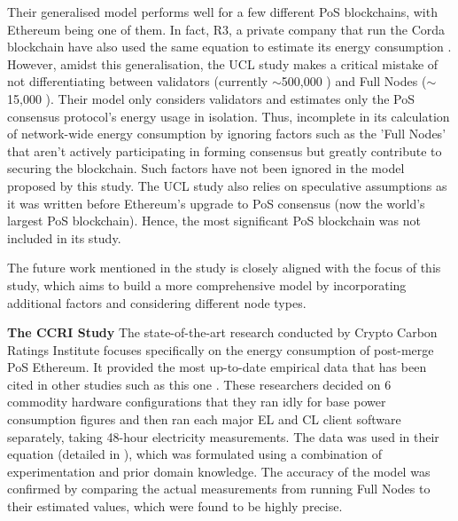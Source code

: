 Their generalised model performs well for a few different PoS blockchains, with Ethereum being one of them. In fact, R3, a private company that run the Corda blockchain have also used the same equation to estimate its energy consumption \cite{JustBlog}. However, amidst this generalisation, the UCL study makes a critical mistake of not differentiating between validators (currently $\sim$500,000 \cite{EthereumEthereum.orgc}) and Full Nodes ($\sim$15,000 \cite{NodewatchAnalytics}). Their model only considers validators and estimates only the PoS consensus protocol’s energy usage in isolation. Thus, incomplete in its calculation of network-wide energy consumption by ignoring factors such as the 'Full Nodes' that aren't actively participating in forming consensus but greatly contribute to securing the blockchain. Such factors have not been ignored in the model proposed by this study. The UCL study also relies on speculative assumptions as it was written before Ethereum’s upgrade to PoS consensus (now the world’s largest PoS blockchain). Hence, the most significant PoS blockchain was not included in its study.

The future work mentioned in the study is closely aligned with the focus of this study, which aims to build a more comprehensive model by incorporating additional factors and considering different node types.


\textbf{The CCRI Study } 
\label{CCRIModelLitRev}
The state-of-the-art research conducted by Crypto Carbon Ratings Institute focuses specifically on the energy consumption of post-merge PoS Ethereum. It provided the most up-to-date empirical data that has been cited in other studies such as this one \cite{CryptoCarbonRatingsInstitute2022TheNetwork}. These researchers decided on 6 commodity hardware configurations that they ran idly for base power consumption figures and then ran each major EL and CL client software separately, taking 48-hour electricity measurements. The data was used in their equation (detailed in ), which was formulated using a combination of experimentation and prior domain knowledge. The accuracy of the model was confirmed by comparing the actual measurements from running Full Nodes to their estimated values, which were found to be highly precise.

